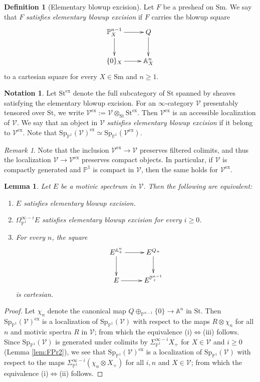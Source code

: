\documentclass{amsart}
\theoremstyle{plain}
\newtheorem{lemma}[theorem]{Lemma}
\theoremstyle{definition}
\newtheorem{definition}[theorem]{Definition}
\newtheorem{notation}[theorem]{Notation}
\theoremstyle{remark}
\newtheorem{remark}[theorem]{Remark}
\numberwithin{equation}{theorem}
\newcommand{\mbb}[1]{\mathbb{#1}}
\newcommand{\Sm}{\mathrm{Sm}}
\newcommand{\St}{\mathrm{St}}
\newcommand{\V}{\mathcal{V}}
\newcommand{\ex}{\mathrm{ex}}
\newcommand{\OmegaP}{\Omega_{\mathbb{P}^1}}
\newcommand{\SigmaP}{\Sigma_{\mathbb{P}^1}}
\newcommand{\SpP}{\mathrm{Sp}_{\mathbb{P}^1}}
\begin{document}
\begin{definition}[Elementary blowup excision]\label{def:EBE}
Let $F$ be a presheaf on $\Sm$.
We say that $F$ \textit{satisfies elementary blowup excision} if $F$ carries the blowup square
\[
\xymatrix{
	\mbb{P}^{n-1}_X \ar[r] \ar[d] & Q \ar[d] \\
	\{0\}_X \ar[r] & \mbb{A}^n_X
}
\]
to a cartesian square for every $X\in\Sm$ and $n\ge 1$.
\end{definition}

\begin{notation}
Let $\St^\ex$ denote the full subcategory of $\St$ spanned by sheaves satisfying the elementary blowup excision.
For an $\infty$-category $\V$ presentably tensored over $\St$, we write $\V^\ex:=\V\otimes_\St\St^\ex$.
Then $\V^\ex$ is an accessible localization of $\V$.
We say that an object in $\V$ \textit{satisfies elementary blowup excision} if it belong to $\V^\ex$.
Note that $\SpP(\V)^\ex\simeq\SpP(\V^\ex)$.
\end{notation}

\begin{remark}
Note that the inclusion $\V^\ex\to\V$ preserves filtered colimits, and thus the localization $\V\to\V^\ex$ preserves compact objects.
In particular, if $\V$ is compactly generated and $\mbb{P}^1$ is compact in $\V$, then the same holds for $\V^\ex$.
\end{remark}

\begin{lemma}\label{lem:EBE}
Let $E$ be a motivic spectrum in $\V$.
Then the following are equivalent:
\begin{enumerate}
\item $E$ satisfies elementary blowup excision.
\item $\OmegaP^{\infty-i}E$ satisfies elementary blowup excision for every $i\ge 0$.
\item For every $n$, the square
\[
\xymatrix{
	E^{\mbb{A}^n_+} \ar[r] \ar[d] & E^{Q_+} \ar[d] \\
	E \ar[r] & E^{\mbb{P}^{n-1}_+}
}
\]
is cartesian.
\end{enumerate}
\end{lemma}
\begin{proof}
Let $\chi_n$ denote the canonical map $Q\oplus_{\mbb{P}^{n-1}}\{0\}\to\mbb{A}^n$ in $\St$.
Then $\SpP(\V)^\ex$ is a localization of $\SpP(\V)$ with respect to the maps $R\otimes\chi_n$ for all $n$ and motivic spectra $R$ in $\V$; from which the equivalence (i)$\Leftrightarrow$(iii) follows.
Since $\SpP(\V)$ is generated under colimits by $\SigmaP^{\infty-i}X_+$ for $X\in\V$ and $i\ge 0$ (Lemma \ref{lem:FPr2}), we see that $\SpP(\V)^\ex$ is a localization of $\SpP(\V)$ with respect to the maps $\SigmaP^{\infty-i}(\chi_n\otimes X_+)$ for all $i,n$ and $X\in\V$; from which the equivalence (i)$\Leftrightarrow$(ii) follows.
\end{proof}
\end{document}
